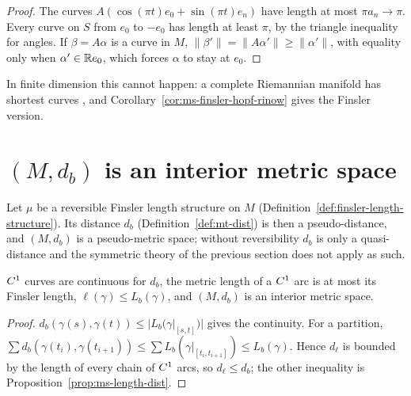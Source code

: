 \begin{proof}
  \leanok
  The curves $A(\cos(\pi t) e_0 + \sin(\pi t) e_n)$ have length at most $\pi a_n \to \pi$. Every
  curve on $S$ from $e_0$ to $-e_0$ has length at least $\pi$, by the triangle inequality for angles.
  If $\beta = A\alpha$ is a curve in $M$, $\|\beta'\| = \|A\alpha'\| \geq \|\alpha'\|$, with equality
  only when $\alpha' \in \mathbb{R} e_0$, which forces $\alpha$ to stay at $e_0$.
\end{proof}

In finite dimension this cannot happen: a complete Riemannian manifold has shortest curves
\cite[Cor.~10.4.3]{Lar22}, and Corollary~\ref{cor:ms-finsler-hopf-rinow} gives the Finsler
version.

\section{\texorpdfstring{$(M, d_b)$}{(M, d)} is an interior metric space}
\label{sec:ms-finsler-interior}

Let $\mu$ be a reversible Finsler length structure on $M$ (Definition~\ref{def:finsler-length-structure}).
Its distance $d_b$ (Definition~\ref{def:mt-dist}) is then a pseudo-distance, and $(M, d_b)$ is a
pseudo-metric space; without reversibility $d_b$ is only a quasi-distance and the symmetric
theory of the previous section does not apply as such.

\begin{theorem}
  \label{thm:ms-finsler-interior}
  \leanok
  $C^{1}$ curves are continuous for $d_b$, the metric length of a $C^{1}$ arc is at most its
  Finsler length, $\ell(\gamma) \leq L_b(\gamma)$, and $(M, d_b)$ is an interior metric space.
\end{theorem}

\begin{proof}
  \leanok
  $d_b(\gamma(s), \gamma(t)) \leq |L_b(\gamma|_{[s, t]})|$ gives the continuity. For a partition,
  $\sum d_b(\gamma(t_i), \gamma(t_{i+1})) \leq \sum L_b(\gamma|_{[t_i, t_{i+1}]}) \leq L_b(\gamma)$.
  Hence $d_\ell$ is bounded by the length of every chain of $C^{1}$ arcs, so $d_\ell \leq d_b$;
  the other inequality is Proposition~\ref{prop:ms-length-dist}.
\end{proof}

